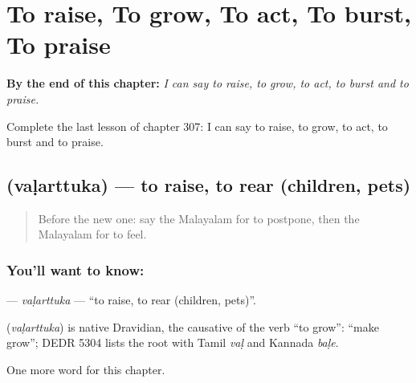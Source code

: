 
\chapter{To raise, To grow, To act, To burst, To praise}
\label{ch:ml-to-raise-to-grow-to-act-to-burst-to-praise}

\begin{chapteropening}
\textbf{By the end of this chapter:} \emph{I can say to raise, to grow, to act, to burst and to praise.}

Complete the last lesson of chapter 307: I can say to raise, to grow, to act, to burst and to praise.
\end{chapteropening}

\section[\texorpdfstring{\ml{വളർത്തുക} (vaḷarttuka)}{വളർത്തുക (vaḷarttuka)}]{ (vaḷarttuka) — to raise, to rear (children, pets)}

\label{lesson:ML-C307-valarttuka}



\begin{quote}
Before the new one: say the Malayalam for to postpone, then the Malayalam for to feel.
\end{quote}

\subsection*{You'll want to know: }
\textbf{} — \emph{vaḷarttuka} — \textquotedblleft{}to raise, to rear (children, pets)\textquotedblright{}.

\begin{cousinweb}
\textbf{} (\emph{vaḷarttuka}) is native Dravidian, the causative of the verb \textquotedblleft{}to grow\textquotedblright{}: \textquotedblleft{}make grow\textquotedblright{}; DEDR 5304 lists the root with Tamil \emph{vaḷ} and Kannada \emph{baḷe}.
\end{cousinweb}

\begin{grammarlens}[title={What you've built}]
One more word for this chapter.
\end{grammarlens}


